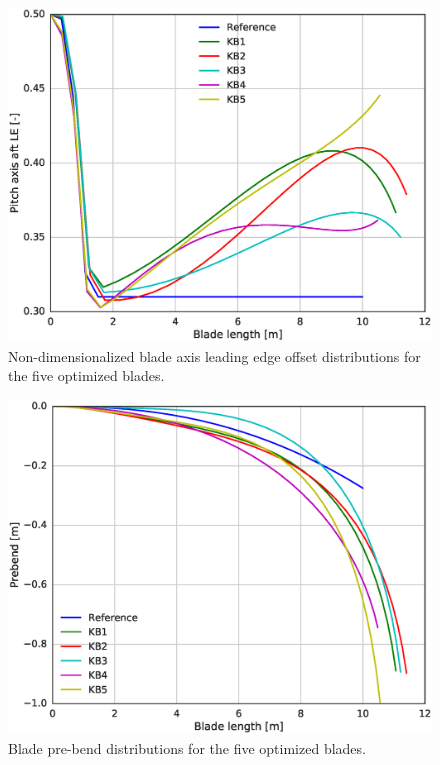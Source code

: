 \begin{figure}[pht]
\begin{center}
	\includegraphics[width=.85\linewidth]{figures/KBcomp_ple.eps}
\end{center}
\caption{Non-dimensionalized blade axis leading edge offset distributions for the five optimized blades.}
\label{fig:p_le}
\end{figure}

\begin{figure}[pht]
\begin{center}
	\includegraphics[width=.85\linewidth]{figures/KBcomp_prebend.eps}
\end{center}
\caption{Blade pre-bend distributions for the five optimized blades.}
\label{fig:prebend}
\end{figure}

